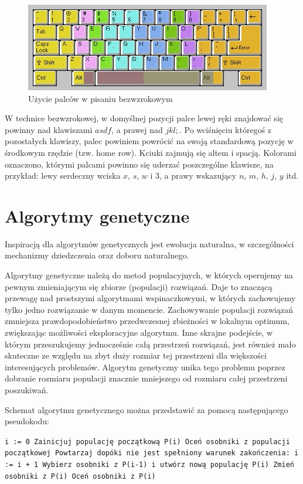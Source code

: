\documentclass[brudnopis]{xmgr}
\begin{document}
\begin{figure}[!tbh]
\centering
\includegraphics[width=.8\hsize]{fig/touchtyping}
\caption{Użycie palców w pisaniu bezwzrokowym}
\end{figure}

W technice bezwzrokowej, w domyślnej pozycji palce lewej ręki znajdować się powinny nad klawiszami $asdf$, a prawej nad $jkl;$. Po wciśnięciu któregoś z pozostałych klawiszy, palec powiniem powrócić na swoją standardową pozycję w środkowym rzędzie (tzw. home row). Kciuki zajmują się altem i spacją. Kolorami oznaczono, którymi palcami powinno się uderzać poszczególne klawisze, na przykład: lewy serdeczny wciska $x$, $s$, $w$ i $3$, a prawy wskazujący $n$, $m$, $h$, $j$, $y$ itd.


\chapter{Algorytmy genetyczne}

Inspiracją dla algorytmów genetycznych jest ewolucja naturalna, w szczególności mechanizmy dziedzczenia oraz doboru naturalnego.

Algorytmy genetyczne należą do metod populacyjnych, w których operujemy na pewnym zmieniającym się zbiorze (populacji) rozwiązań. Daje to znaczącą przewagę nad prostszymi algorytmami wspinaczkowymi, w których zachowujemy tylko jedno rozwiązanie w danym momencie. Zachowywanie populacji rozwiązań zmniejsza prawdopodobieństwo przedwczesnej zbieżności w lokalnym optimum, zwiększając możliwości eksploracyjne algorytmu. Inne skrajne podejście, w którym przeszukujemy jednocześnie całą przestrzeń rozwiązań, jest również mało skuteczne ze względu na zbyt duży rozmiar tej przestrzeni dla większości interesujących problemów. Algorytm genetyczny unika tego problemu poprzez dobranie rozmiaru populacji znacznie mniejszego od rozmiaru całej przestrzeni poszukiwań.

Schemat algorytmu genetycznego można przedstawić za pomocą następującego pseudokodu:

\noindent
\texttt{i := 0\newline
Zainicjuj populację początkową P(i)\newline
Oceń osobniki z populacji początkowej\newline
Powtarzaj dopóki nie jest spełniony warunek zakończenia:\newline
\indent i := i + 1\newline
\indent Wybierz osobniki z P(i-1) i utwórz nową populację P(i)\newline
\indent Zmień osobniki z P(i)\newline
\indent Oceń osobniki z P(i)\newline
}
\end{document}
